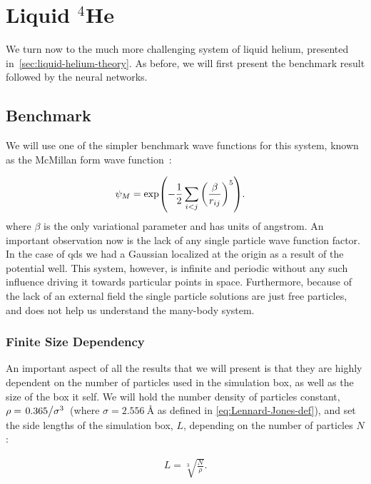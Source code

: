 \documentclass[Thesis.tex]{subfiles}
\begin{document}
\chapter{Liquid $^4$He}
\label{chp:liquid-helium}

\glsresetall

We turn now to the much more challenging system of liquid helium, presented
in~\cref{sec:liquid-helium-theory}. As before, we will first present the
benchmark result followed by the neural networks.


\section{Benchmark}

We will use one of the simpler benchmark wave functions for this system, known
as the McMillan form wave function~\cite{McMillan-1965}:

\begin{align}
  \label{eq:McMillan-wave-function-def}
  \psi_{M} &= \exp(-\frac{1}{2}\sum_{i<j} \qty(\frac{\beta}{r_{ij}})^5).
\end{align}
where $\beta$ is the only variational parameter and has units of angstrom. An
important observation now is the lack of any single particle wave function
factor. In the case of \glspl{qd} we had a Gaussian localized at the origin
as a result of the potential well. This system, however, is infinite and
periodic without any such influence driving it towards particular points in
space. Furthermore, because of the lack of an external field the single particle
solutions are just free particles, and does not help us understand the many-body
system.

\subsection{Finite Size Dependency}

An important aspect of all the results that we will present is that they are
highly dependent on the number of particles used in the simulation box, as well
as the size of the box it self. We will hold the number density of particles
constant, $\rho = \flatfrac{\num{0.365}}{\sigma^3}$ (where $\sigma =
\SI{2.556}{\angstrom}$ as defined in \cref{eq:Lennard-Jones-def}), and set the
side lengths of the simulation box, $L$, depending on
the number of particles $N$:

\begin{align}
  L = \sqrt[3]{\frac{N}{\rho}}.
\end{align}
\end{document}
